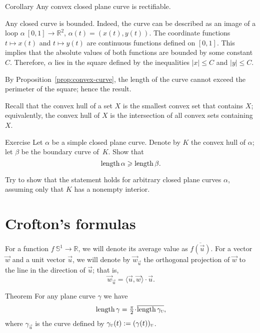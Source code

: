 \begin{thm}{Corollary}\label{cor:convex=>rectifiable}
Any convex closed plane curve is rectifiable.  
\end{thm}

Any closed curve is bounded.
Indeed, the curve can be described as an image of a loop $\alpha\:[0,1]\to\mathbb{R}^2$, $\alpha(t)=(x(t),y(t))$.
The coordinate functions $t\mapsto x(t)$ and $t\mapsto y(t)$ are continuous functions defined on $[0,1]$.
This implies that the absolute values of both functions are bounded by some constant~$C$.
Therefore, $\alpha$ lies in the square defined by the inequalities $|x|\le C$ and $|y|\le C$.


By Proposition~\ref{prop:convex-curve}, the length of the curve cannot exceed the perimeter of the square; hence the result.
\qeds

Recall that the convex hull of a set $X$ is the smallest convex set that contains $X$; equivalently, the convex hull of $X$ is the intersection of all convex sets containing~$X$.

\begin{thm}{Exercise}\label{ex:convex-hull}
Let $\alpha$ be a simple closed plane curve.
Denote by $K$ the convex hull of $\alpha$; let $\beta$ be the boundary curve of~$K$.
Show that 
\[\mathop{\rm length}\nolimits \alpha\geqslant \mathop{\rm length}\nolimits \beta.\]

Try to show that the statement holds for arbitrary closed plane curves $\alpha$, assuming only that $K$ has a nonempty interior.
\end{thm}


\section{Crofton's formulas}
\label{sec:crofton}

For a function $f\: \mathbb{S}^1 \to \mathbb{R}$, we will denote its average value as $\overline{f(\vec u)}$.
For a vector $\vec w$ and a unit vector $\vec u$, we will denote by $\vec w_{\vec u}$ the orthogonal projection of $\vec w$ to the line in the direction of  $\vec u$;
that is,
\[\vec w_{\vec u}=\langle\vec u,\vec w\rangle\cdot\vec u.\] 

\begin{thm}{Theorem}
For any plane curve $\gamma$ we have
\[
\length\gamma
=\tfrac\pi2\cdot \overline{\length\gamma_{\vec u}},
\]
where $\gamma_{\vec u}$ is the curve defined by $\gamma_{\text{\sc{u}}}(t) \mathrel{:=} (\gamma (t))_{\text{\sc{u}}}$.
\end{thm}


